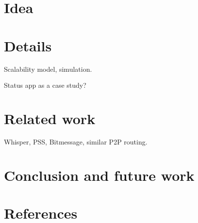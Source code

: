 \documentclass[12pt]{article}
\begin{document}
\section{Idea}
\section{Details}
Scalability model, simulation.

Status app as a case study?

\section{Related work}
Whisper, PSS, Bitmessage, similar P2P routing.
\section{Conclusion and future work}
\section{References}
\end{document}
